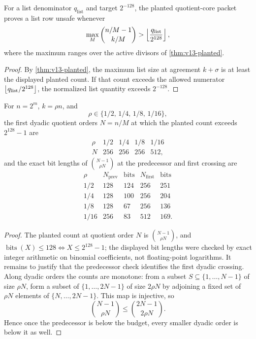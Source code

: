 \begin{corollary}\label{cor:v13-list-unsafe}
For a list denominator $q_{\mathrm{list}}$ and target $2^{-128}$, the planted quotient-core packet proves a list row unsafe whenever
\[
\max_M\binom{n/M-1}{k/M}>
\left\lfloor \frac{q_{\mathrm{list}}}{2^{128}}\right\rfloor,
\]
where the maximum ranges over the active divisors of \cref{thm:v13-planted}.
\end{corollary}

\begin{proof}
By \cref{thm:v13-planted}, the maximum list size at agreement $k+\sigma$ is at least the displayed planted count.  If that count exceeds the allowed numerator $\left\lfloor q_{\mathrm{list}}/2^{128}\right\rfloor$, the normalized list quantity exceeds $2^{-128}$.
\end{proof}

\begin{proposition}\label{prop:v13-dyadic-planted}
For $n=2^m$, $k=\rho n$, and
\[
        \rho\in\{1/2,\,1/4,\,1/8,\,1/16\},
\]
the first dyadic quotient orders $N=n/M$ at which the planted count exceeds $2^{128}-1$ are
\[
\begin{array}{c|cccc}
\rho & 1/2 & 1/4 & 1/8 & 1/16\\ \hline
N & 256 & 256 & 256 & 512 ,
\end{array}
\]
and the exact bit lengths of $\binom{N-1}{\rho N}$ at the predecessor and first crossing are
\[
\begin{array}{c|cc|cc}
\rho & N_{\mathrm{prev}} & \operatorname{bits} & N_{\mathrm{first}} & \operatorname{bits}\\ \hline
1/2  & 128 & 124 & 256 & 251\\
1/4  & 128 & 100 & 256 & 204\\
1/8  & 128 &  67 & 256 & 136\\
1/16 & 256 &  83 & 512 & 169.
\end{array}
\]
\end{proposition}

\begin{proof}
The planted count at quotient order $N$ is $\binom{N-1}{\rho N}$, and $\operatorname{bits}(X)\le128\iff X\le2^{128}-1$; the displayed bit lengths were checked by exact integer arithmetic on binomial coefficients, not floating-point logarithms.  It remains to justify that the predecessor check identifies the first dyadic crossing.  Along dyadic orders the counts are monotone: from a subset $S\subseteq\{1,\ldots,N-1\}$ of size $\rho N$, form a subset of $\{1,\ldots,2N-1\}$ of size $2\rho N$ by adjoining a fixed set of $\rho N$ elements of $\{N,\ldots,2N-1\}$.  This map is injective, so
\[
        \binom{N-1}{\rho N}\le \binom{2N-1}{2\rho N}.
\]
Hence once the predecessor is below the budget, every smaller dyadic order is below it as well.
\end{proof}

